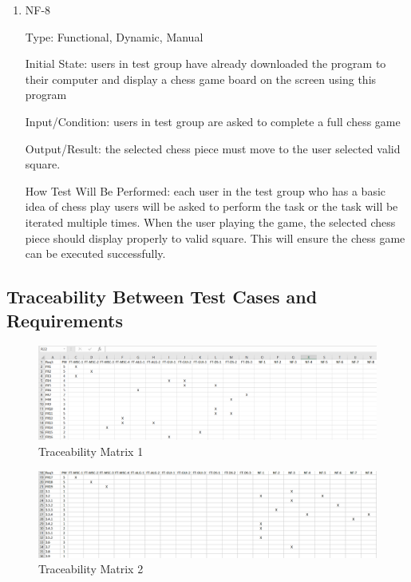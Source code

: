 \documentclass[12pt, titlepage]{article}
\begin{document}
\begin{enumerate}
\item{NF-8\\}

Type: Functional, Dynamic, Manual

Initial State: users in test group have already downloaded the program to their computer and display a chess game board on the screen using this program 

Input/Condition: users in test group are asked to complete a full chess game

Output/Result: the selected chess piece must move to the user selected valid square.

How Test Will Be Performed: each user in the test group who has a basic idea of chess play users will be asked to perform the task or the task will be iterated multiple times. When the user playing the game, the selected chess piece should display properly to valid square. This will ensure the chess game can be executed successfully. 

\end{enumerate}

\subsection{Traceability Between Test Cases and Requirements}

\begin{figure}[H]
  \includegraphics[width=\linewidth]{trace1.png}
  \caption{Traceability Matrix 1}
  \label{fig:tra1}
\end{figure}

\begin{figure}[H]
  \includegraphics[width=\linewidth]{trace2.png}
  \caption{Traceability Matrix 2}
  \label{fig:tra2}
\end{figure}
\end{document}
